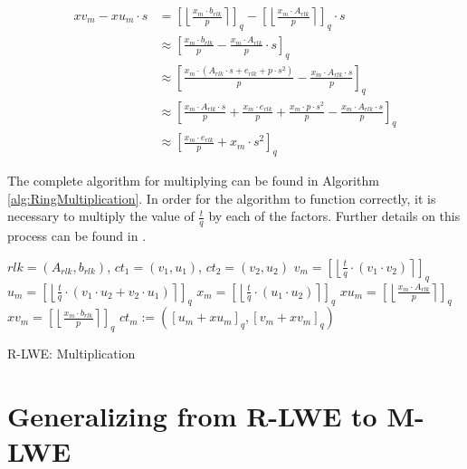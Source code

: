 \begin{equation}
  \begin{split}
    xv_m - xu_m \cdot s & = \left[\left\lfloor \frac{x_m \cdot b_{rlk}}{p}  \right\rceil \right]_q - \left[\left\lfloor \frac{x_m \cdot A_{rlk}}{p}  \right\rceil \right]_q \cdot s  \\
                        & \approx \left[\frac{x_m \cdot b_{rlk}}{p} - \frac{x_m \cdot A_{rlk}}{p} \cdot s\right]_q                                                                   \\
                        & \approx \left[\frac{x_m \cdot (A_{rlk}\cdot s+e_{rlk}+p\cdot s^2)}{p} - \frac{x_m \cdot A_{rlk} \cdot s}{p}\right]_q                                       \\
                        & \approx \left[\frac{x_m \cdot A_{rlk}\cdot s}{p}+\frac{x_m \cdot e_{rlk}}{p}+\frac{x_m \cdot p\cdot s^2}{p} - \frac{x_m \cdot A_{rlk} \cdot s}{p}\right]_q \\
                        & \approx \left[\frac{x_m \cdot e_{rlk}}{p}+ x_m \cdot s^2 \right]_q
  \end{split}
  \label{eq:RlkDecryption}
\end{equation}

The complete algorithm for multiplying can be found in Algorithm \ref{alg:RingMultiplication}. In order for the algorithm to function correctly, it is necessary to multiply the value of $\frac{t}{q}$ by each of the factors. Further details on this process can be found in \cite{bfv}.

\begin{algorithm}[htb]
  \begin{algorithmic}[1]
    \REQUIRE $rlk=(A_{rlk}, b_{rlk})$, $ct_1 = (v_1, u_1)$, $ct_2 = (v_2, u_2)$
    \STATE $v_m = \left[\left\lfloor \frac{t}{q}\cdot (v_1 \cdot v_2)\right\rceil\right] _q $
    \STATE $u_m = \left[\left\lfloor \frac{t}{q}\cdot(v_1 \cdot u_2 + v_2 \cdot u_1)\right\rceil\right] _q$
    \STATE $x_m = \left[\left\lfloor \frac{t}{q}\cdot(u_1 \cdot u_2)\right\rceil\right] _q$
    \STATE $xu_m = \left[\left\lfloor \frac{x_m \cdot A_{rlk}}{p}  \right\rceil \right]_q$
    \STATE $xv_m = \left[\left\lfloor \frac{x_m \cdot b_{rlk}}{p}  \right\rceil \right]_q$
    \RETURN $ct_m:=(\left[u_m + xu_m\right]_q , \left[v_m + xv_m\right]_q )$
  \end{algorithmic}
  \caption{R-LWE: Multiplication}
  \label{alg:RingMultiplication}
\end{algorithm}

\section{Generalizing from R-LWE to M-LWE}

